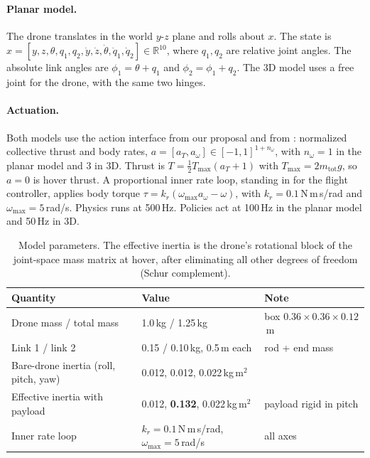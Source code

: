 \documentclass{article}
\newcommand{\R}{\mathbb{R}}
\begin{document}
\paragraph{Planar model.} The drone translates in the world $y$-$z$ plane and rolls
about $x$. The state is
$x = [y, z, \theta, q_1, q_2, \dot y, \dot z, \dot\theta, \dot q_1, \dot q_2] \in \R^{10}$,
where $q_1, q_2$ are relative joint angles. The absolute link angles are
$\phi_1 = \theta + q_1$ and $\phi_2 = \phi_1 + q_2$. The 3D model uses a free joint
for the drone, with the same two hinges.

\paragraph{Actuation.} Both models use the action interface from our proposal and from
\citet{kim2025roverfly}: normalized collective thrust and body rates,
$a = [a_T, a_\omega] \in [-1,1]^{1+n_\omega}$, with $n_\omega = 1$ in the planar model
and $3$ in 3D. Thrust is $T = \tfrac12 T_{\max}(a_T + 1)$ with
$T_{\max} = 2 m_{\text{tot}} g$, so $a = 0$ is hover thrust. A proportional inner rate
loop, standing in for the flight controller, applies body torque
$\tau = k_r(\omega_{\max} a_\omega - \omega)$, with $k_r = 0.1$\,N\,m\,s/rad and
$\omega_{\max} = 5$\,rad/s. Physics runs at 500\,Hz. Policies act at 100\,Hz in the
planar model and 50\,Hz in 3D.

\begin{table}[t]
  \centering
  \small
  \caption{Model parameters. The effective inertia is the drone's rotational block of
  the joint-space mass matrix at hover, after eliminating all other degrees of freedom
  (Schur complement).}
  \label{tab:params}
  \begin{tabular}{lll}
    \toprule
    Quantity & Value & Note \\
    \midrule
    Drone mass / total mass & 1.0\,kg / 1.25\,kg & box $0.36\times0.36\times0.12$\,m \\
    Link 1 / link 2 & 0.15 / 0.10\,kg, 0.5\,m each & rod + end mass \\
    Bare-drone inertia (roll, pitch, yaw) & 0.012, 0.012, 0.022\,kg\,m$^2$ & \\
    Effective inertia with payload & 0.012, \textbf{0.132}, 0.022\,kg\,m$^2$ & payload rigid in pitch \\
    Inner rate loop & $k_r = 0.1$\,N\,m\,s/rad, $\omega_{\max} = 5$\,rad/s & all axes \\
    \bottomrule
  \end{tabular}
\end{table}
\end{document}
